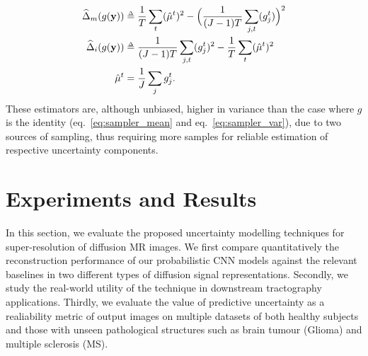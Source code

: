 \begin{align}
\widehat{\Delta}_{m}(g(\mathbf{y}))  &\delequal \frac{1}{T}\sum_{t}(\hat{\mu}^{t})^2  - \Big{(}\frac{1}{(J-1)T}\sum_{j,t}(g^{t}_{j}) \Big{)}^2 \label{eq:mc_model_uncertainty} \\ 
\widehat{\Delta}_{i}(g(\mathbf{y}))  &\delequal  \frac{1}{(J-1)T}\sum_{j,t}(g^{t}_{j})^2 - \frac{1}{T}\sum_{t}(\hat{\mu}^{t})^2 \label{eq:mc_intrinsic_uncertainty} \\
\hat{\mu}^{t} & = \frac{1}{J}\sum_{j}g^{t}_{j}. 
\end{align}
These estimators are, although unbiased, higher in variance than the case where $g$ is the identity (eq.~\eqref{eq:sampler_mean} and eq.~\eqref{eq:sampler_var}), due to two sources of sampling, thus requiring more samples for reliable estimation of respective uncertainty components. 



\section{Experiments and Results}

In this section, we evaluate the proposed uncertainty modelling techniques for super-resolution of diffusion MR images. We first compare quantitatively the reconstruction performance of our probabilistic CNN models against the relevant baselines in two different types of diffusion signal representations. Secondly, we study the real-world utility of the technique in downstream tractography applications. Thirdly, we evaluate the value of predictive uncertainty as a realiability metric of output images on multiple datasets of both healthy subjects and those with unseen pathological structures such as brain tumour (Glioma) and multiple sclerosis (MS). 



